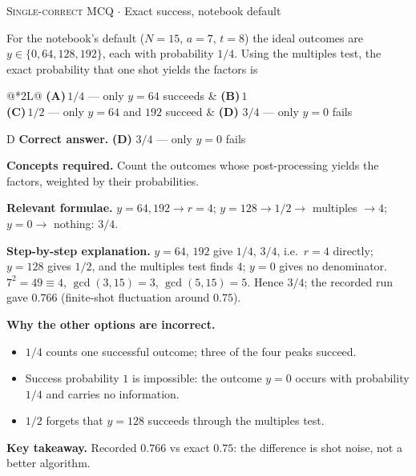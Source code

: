 \documentclass[11pt,a4paper]{article}
\newcommand{\optlabel}[1]{\textbf{(#1)}}
\newcommand{\correctlabel}[1]{\textcolor{okgreen}{\textbf{(#1)}\,\ding{51}}}
\newenvironment{qitem}[1]{\begin{list}{}{\setlength{\leftmargin}{3.3em}\setlength{\labelwidth}{3.1em}%
  \setlength{\labelsep}{0.2em}\setlength{\topsep}{3pt}\setlength{\parsep}{3pt}}\item[\textbf{Q.#1}\hfill]}{\end{list}}
\newcommand{\qsep}{\par\vspace{2pt}{\color{black!15}\hrule}\vspace{4pt}}
\newcommand{\qmeta}[2]{{\footnotesize\color{black!60}\textsc{#1} \;$\cdot$\; #2}\par}
\begin{document}
\begin{qitem}{51}
\qmeta{Single-correct MCQ}{Exact success, notebook default}
For the notebook's default ($N = 15$, $a = 7$, $t = 8$) the ideal outcomes are $y \in \{0, 64, 128, 192\}$, each with probability $1/4$. Using the
multiples test, the exact probability that one shot yields the factors is
\par\smallskip\noindent\begin{tabularx}{\linewidth}{@{}*{2}{L}@{}}
\optlabel{A}\,$1/4$ --- only $y = 64$ succeeds & \optlabel{B}\,$1$ \\[3pt]
\optlabel{C}\,$1/2$ --- only $y = 64$ and $192$ succeed & \correctlabel{D}\,$3/4$ --- only $y = 0$ fails
\end{tabularx}
\end{qitem}
\begin{solbox}{D}
\textbf{\color{brand}Correct answer.} \textcolor{okgreen}{\textbf{(D)}} $3/4$ --- only $y = 0$ fails

\textbf{\color{brand}Concepts required.} Count the outcomes whose post-processing yields the factors, weighted by their probabilities.

\textbf{\color{brand}Relevant formulae.} $y = 64, 192 \to r = 4$; $y = 128 \to 1/2 \to$ multiples $\to 4$; $y = 0 \to$ nothing: $3/4$.

\textbf{\color{brand}Step-by-step explanation.} $y = 64$, $192$ give $1/4$, $3/4$, i.e.\ $r = 4$ directly; $y = 128$ gives $1/2$, and the multiples test finds $4$; $y = 0$ gives no denominator. $7^2 = 49 \equiv 4$,
$\gcd(3, 15) = 3$, $\gcd(5, 15) = 5$. Hence $3/4$; the recorded run gave $0.766$ (finite-shot fluctuation around $0.75$).

\textbf{\color{brand}Why the other options are incorrect.}
\begin{itemize}[leftmargin=2.4em, itemsep=1pt, topsep=2pt]
\item[\textbf{(A)}] $1/4$ counts one successful outcome; three of the four peaks succeed.
\item[\textbf{(B)}] Success probability $1$ is impossible: the outcome $y = 0$ occurs with probability $1/4$ and carries no information.
\item[\textbf{(C)}] $1/2$ forgets that $y = 128$ succeeds through the multiples test.
\end{itemize}
\textbf{\color{brand}Key takeaway.} Recorded $0.766$ vs exact $0.75$: the difference is shot noise, not a better algorithm.
\end{solbox}
\qsep
\end{document}
